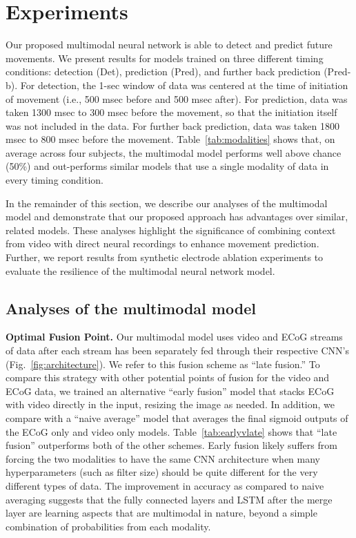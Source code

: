 \documentclass[letterpaper]{article} %
\begin{document}
\section{Experiments}

Our proposed multimodal neural network is able to detect and predict future movements.
We present results for models trained on three different timing conditions: detection (Det), prediction (Pred), and further back prediction (Pred-b).
For detection, the 1-sec window of data was centered at the time of initiation of movement (i.e., 500 msec before and 500 msec after).
For prediction, data was taken 1300 msec to 300 msec before the movement, so that the initiation itself was not included in the data.
For further back prediction, data was taken 1800 msec to 800 msec before the movement.
Table~\ref{tab:modalities} shows that, on average across four subjects, the multimodal model performs well above chance (50\%) and out-performs similar models that use a single modality of data in every timing condition.

In the remainder of this section, we describe our analyses of the multimodal model and demonstrate that our proposed approach has advantages over similar, related models.
These analyses highlight the significance of combining context from video with direct neural recordings to enhance movement prediction.
Further, we report results from synthetic electrode ablation experiments to evaluate the resilience of the multimodal neural network model.

\subsection{Analyses of the multimodal model}

\textbf{Optimal Fusion Point.} Our multimodal model uses video and ECoG streams of data after each stream has been separately fed through their respective CNN's (Fig.~\ref{fig:architecture}).
We refer to this fusion scheme as ``late fusion.''
To compare this strategy with other potential points of fusion for the video and ECoG data, we trained an alternative ``early fusion'' model that stacks ECoG with video directly in the input, resizing the image as needed.
In addition, we compare with a ``naive average'' model that averages the final sigmoid outputs of the ECoG only and video only models.
Table~\ref{tab:earlyvlate} shows that ``late fusion'' outperforms both of the other schemes.
Early fusion likely suffers from forcing the two modalities to have the same CNN architecture when many hyperparameters (such as filter size) should be quite different for the very different types of data. 
The improvement in accuracy as compared to naive averaging suggests that the fully connected layers and LSTM after the merge layer are learning aspects that are multimodal in nature, beyond a simple combination of probabilities from each modality. 
\end{document}
